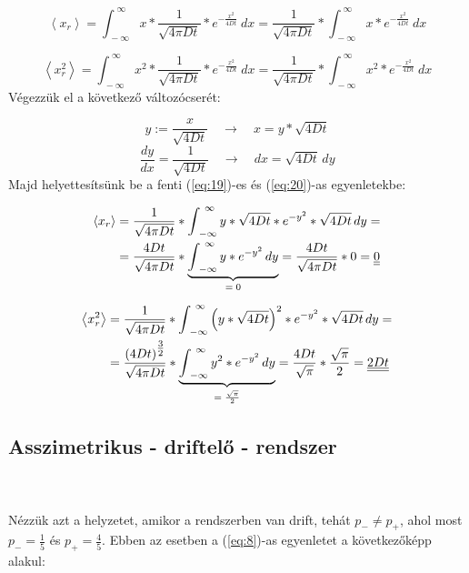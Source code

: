 \begin{equation} \label{eq:19}
    \left< x_{r} \right>
    =
    \int_{\ -\infty}^{\ \infty} x * \frac{1}{\sqrt{4 \pi D t}} * e^{-\tfrac{x^{2}}{4Dt}}\ dx
    =
    \frac{1}{\sqrt{4 \pi D t}} * \int_{\ -\infty}^{\ \infty} x * e^{-\tfrac{x^{2}}{4Dt}}\ dx
\end{equation}

\begin{equation} \label{eq:20}
    \left< x_{r}^{2} \right>
    =
    \int_{\ -\infty}^{\ \infty} x^{2} * \frac{1}{\sqrt{4 \pi D t}} * e^{-\tfrac{x^{2}}{4Dt}}\ dx
    =
    \frac{1}{\sqrt{4 \pi D t}} * \int_{\ -\infty}^{\ \infty} x^{2} * e^{-\tfrac{x^{2}}{4Dt}}\ dx
\end{equation}
Végezzük el a következő változócserét:

\begin{equation*}
    y := \frac{x}{\sqrt{4Dt}} \quad \to \quad x = y * \sqrt{4Dt}
\end{equation*}
\begin{equation*}
    \frac{dy}{dx} = \frac{1}{\sqrt{4Dt}} \quad \to \quad dx = \sqrt{4Dt}\, dy
\end{equation*}
Majd helyettesítsünk be a fenti (\ref{eq:19})-es és (\ref{eq:20})-as egyenletekbe:

\begin{align} \label{eq:21}
    \left< x_{r} \right>
    &=
    \frac{1}{\sqrt{4 \pi D t}} * \int_{\ -\infty}^{\ \infty} y * \sqrt{4Dt} * e^{-y^{2}} * \sqrt{4Dt}\, dy = \nonumber \\
    &=
    \frac{4Dt}{\sqrt{4 \pi D t}} * \underbrace{\int_{\ -\infty}^{\ \infty} y * e^{-y^{2}}\, dy}_{\text{\normalfont $= 0$}}
    =
    \frac{4Dt}{\sqrt{4 \pi D t}} * 0 = \doubleunderline{0}
\end{align}

\begin{align} \label{eq:22}
    \left< x_{r}^{2} \right>
    &=
    \frac{1}{\sqrt{4 \pi D t}} * \int_{\ -\infty}^{\ \infty} \left( y * \sqrt{4Dt} \right)^{2} * e^{-y^{2}} * \sqrt{4Dt}\, dy = \nonumber \\
    &=
    \frac{\left( 4Dt \right)^{\tfrac{3}{2}}}{\sqrt{4 \pi D t}} * \underbrace{\int_{\ -\infty}^{\ \infty} y^{2} * e^{-y^{2}}\, dy}_{\text{\normalfont $= \frac{\sqrt{\pi}}{2}$}}
    =
    \frac{4Dt}{\sqrt{\pi}} * \frac{\sqrt{\pi}}{2}
    =
    \underline{\underline{2Dt}}
\end{align}

\subsection{Asszimetrikus - driftelő - rendszer} \label{subsec:3.2}
\\ \\
Nézzük azt a helyzetet, amikor a rendszerben van drift, tehát $p_{-} \neq p_{+}$, ahol most $p_{-} = \frac{1}{5}$ és $p_{+} = \frac{4}{5}$. Ebben az esetben a (\ref{eq:8})-as egyenletet a következőképp alakul:

